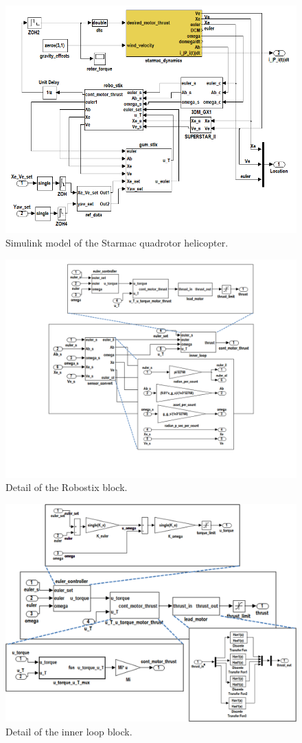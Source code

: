 \begin{figure}[thb]
\centering
\includegraphics[width=0.8\columnwidth]{figures/real_quadrotor_mdl.png}
    \caption{Simulink model of the Starmac quadrotor helicopter.}
    \label{fig:real_qr_mdl}
\end{figure}

\begin{figure}[thb]
\centering
\includegraphics[width=0.8\columnwidth]{figures/real_quadrotor_rs_parts.png}
    \caption{Detail of the Robostix block.}
    \label{fig:real_qr_robostix}
\end{figure}

\begin{figure}[thb]
\centering
\includegraphics[width=0.9\columnwidth]{figures/real_quadrotor_inner_loop_parts.png}
    \caption{Detail of the inner loop block.}
    \label{fig:real_qr_inner_loop}
\end{figure}

